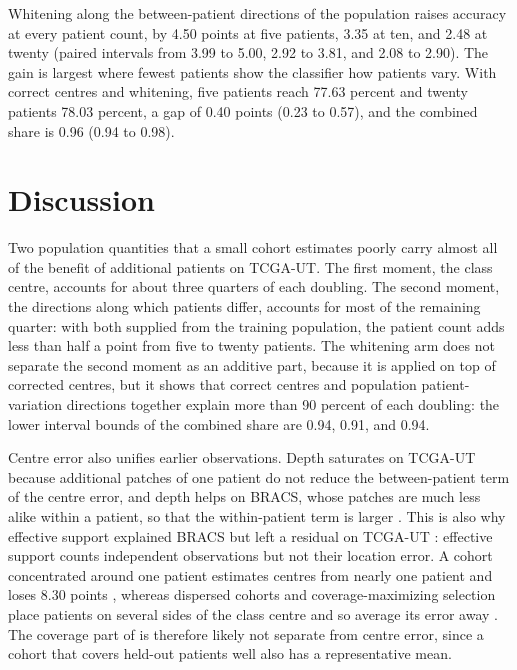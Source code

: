 \documentclass[11pt]{article}
\begin{document}
Whitening along the between-patient directions of the population raises accuracy at every patient count, by 4.50 points at five patients, 3.35 at ten, and 2.48 at twenty (paired intervals from 3.99 to 5.00, 2.92 to 3.81, and 2.08 to 2.90). The gain is largest where fewest patients show the classifier how patients vary. With correct centres and whitening, five patients reach 77.63 percent and twenty patients 78.03 percent, a gap of 0.40 points (0.23 to 0.57), and the combined share is 0.96 (0.94 to 0.98).

\section{Discussion}
\label{sec:discussion}
Two population quantities that a small cohort estimates poorly carry almost all of the benefit of additional patients on TCGA-UT. The first moment, the class centre, accounts for about three quarters of each doubling. The second moment, the directions along which patients differ, accounts for most of the remaining quarter: with both supplied from the training population, the patient count adds less than half a point from five to twenty patients. The whitening arm does not separate the second moment as an additive part, because it is applied on top of corrected centres, but it shows that correct centres and population patient-variation directions together explain more than 90 percent of each doubling: the lower interval bounds of the combined share are 0.94, 0.91, and 0.94.

Centre error also unifies earlier observations. Depth saturates on TCGA-UT because additional patches of one patient do not reduce the between-patient term of the centre error, and depth helps on BRACS, whose patches are much less alike within a patient, so that the within-patient term is larger \citep{queisler2026effectiveSupport}. This is also why effective support explained BRACS but left a residual on TCGA-UT \citep{queisler2026effectiveSupport,queisler2026multidirectionalRedundancy}: effective support counts independent observations but not their location error. A cohort concentrated around one patient estimates centres from nearly one patient and loses 8.30 points \citep{queisler2026cohortComposition}, whereas dispersed cohorts and coverage-maximizing selection place patients on several sides of the class centre and so average its error away \citep{queisler2026cohortComposition,queisler2026shortageSelection}. The coverage part of \citet{queisler2026hullCoverage} is therefore likely not separate from centre error, since a cohort that covers held-out patients well also has a representative mean.
\end{document}
